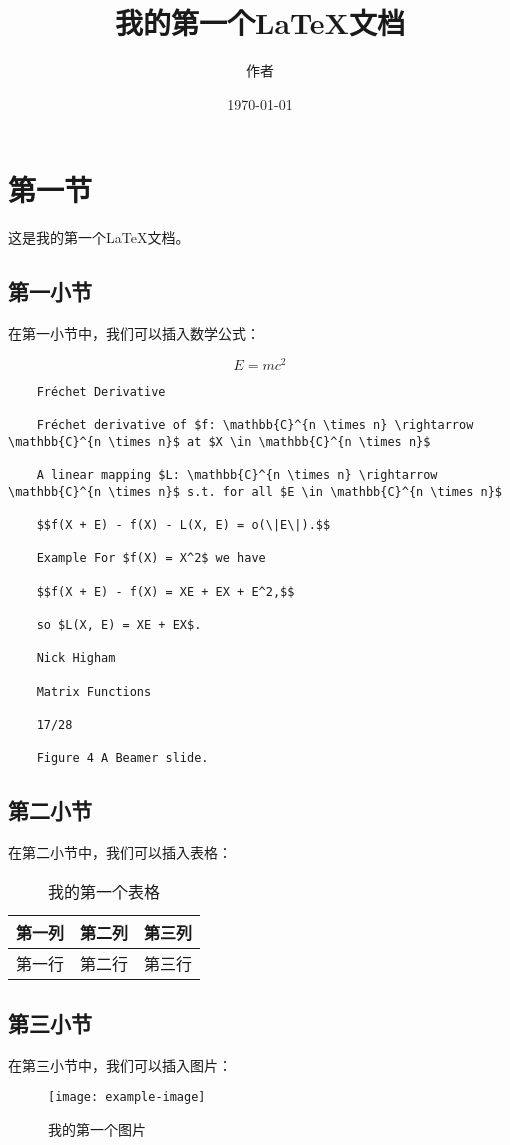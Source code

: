 \documentclass[UTF8]{ctexart}
\title{我的第一个LaTeX文档}
\author{作者}
\date{\today}
\begin{document}
\maketitle

\section{第一节}

这是我的第一个LaTeX文档。

\subsection{第一小节}

在第一小节中，我们可以插入数学公式：

\begin{equation}
E=mc^2
\end{equation}

\begin{verbatim}
    Fréchet Derivative
    
    Fréchet derivative of $f: \mathbb{C}^{n \times n} \rightarrow \mathbb{C}^{n \times n}$ at $X \in \mathbb{C}^{n \times n}$
    
    A linear mapping $L: \mathbb{C}^{n \times n} \rightarrow \mathbb{C}^{n \times n}$ s.t. for all $E \in \mathbb{C}^{n \times n}$
    
    $$f(X + E) - f(X) - L(X, E) = o(\|E\|).$$
    
    Example For $f(X) = X^2$ we have
    
    $$f(X + E) - f(X) = XE + EX + E^2,$$
    
    so $L(X, E) = XE + EX$.
    
    Nick Higham
    
    Matrix Functions
    
    17/28
    
    Figure 4 A Beamer slide.
    \end{verbatim}

\subsection{第二小节}

在第二小节中，我们可以插入表格：

\begin{table}[htbp]
\centering
\begin{tabular}{|c|c|c|}
\hline
第一列 & 第二列 & 第三列 \\
\hline
第一行 & 第二行 & 第三行 \\
\hline
\end{tabular}
\caption{我的第一个表格}
\end{table}

\subsection{第三小节}

在第三小节中，我们可以插入图片：

\begin{figure}[htbp]
\centering
\texttt{[image: example-image]}
\caption{我的第一个图片}
\end{figure}



\end{document}
